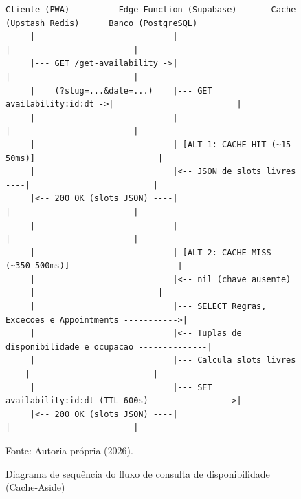 \documentclass[12pt,a4paper]{article}
\begin{document}
\begin{figure}[hbt]
\centering
\begin{lstlisting}
Cliente (PWA)          Edge Function (Supabase)       Cache (Upstash Redis)      Banco (PostgreSQL)
     |                            |                             |                         |
     |--- GET /get-availability ->|                             |                         |
     |    (?slug=...&date=...)    |--- GET availability:id:dt ->|                         |
     |                            |                             |                         |
     |                            | [ALT 1: CACHE HIT (~15-50ms)]                         |
     |                            |<-- JSON de slots livres ----|                         |
     |<-- 200 OK (slots JSON) ----|                             |                         |
     |                            |                             |                         |
     |                            | [ALT 2: CACHE MISS (~350-500ms)]                      |
     |                            |<-- nil (chave ausente) -----|                         |
     |                            |--- SELECT Regras, Excecoes e Appointments ----------->|
     |                            |<-- Tuplas de disponibilidade e ocupacao --------------|
     |                            |--- Calcula slots livres ----|                         |
     |                            |--- SET availability:id:dt (TTL 600s) ---------------->|
     |<-- 200 OK (slots JSON) ----|                             |                         |
\end{lstlisting}
\caption{Diagrama de sequência do fluxo de consulta de disponibilidade (Cache-Aside)}
\label{fig:seq_leitura}
\vspace{0.1cm}
{\footnotesize Fonte: Autoria própria (2026).}
\end{figure}
\end{document}
